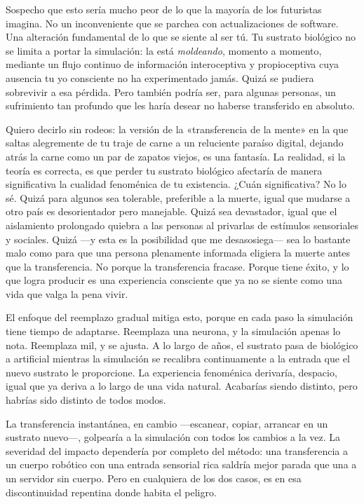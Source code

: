 \documentclass[11pt, twoside, openright]{book}
\begin{document}
Sospecho que esto sería mucho peor de lo que la mayoría de los futuristas imagina. No un inconveniente que se parchea con actualizaciones de software. Una alteración fundamental de lo que se siente al ser tú. Tu sustrato biológico no se limita a portar la simulación: la está \textit{moldeando}, momento a momento, mediante un flujo continuo de información interoceptiva y propioceptiva cuya ausencia tu yo consciente no ha experimentado jamás. Quizá se pudiera sobrevivir a esa pérdida. Pero también podría ser, para algunas personas, un sufrimiento tan profundo que les haría desear no haberse transferido en absoluto.

Quiero decirlo sin rodeos: la versión de la «transferencia de la mente» en la que saltas alegremente de tu traje de carne a un reluciente paraíso digital, dejando atrás la carne como un par de zapatos viejos, es una fantasía. La realidad, si la teoría es correcta, es que perder tu sustrato biológico afectaría de manera significativa la cualidad fenoménica de tu existencia. ¿Cuán significativa? No lo sé. Quizá para algunos sea tolerable, preferible a la muerte, igual que mudarse a otro país es desorientador pero manejable. Quizá sea devastador, igual que el aislamiento prolongado quiebra a las personas al privarlas de estímulos sensoriales y sociales. Quizá ---y esta es la posibilidad que me desasosiega--- sea lo bastante malo como para que una persona plenamente informada eligiera la muerte antes que la transferencia. No porque la transferencia fracase. Porque tiene éxito, y lo que logra producir es una experiencia consciente que ya no se siente como una vida que valga la pena vivir.

El enfoque del reemplazo gradual mitiga esto, porque en cada paso la simulación tiene tiempo de adaptarse. Reemplaza una neurona, y la simulación apenas lo nota. Reemplaza mil, y se ajusta. A lo largo de años, el sustrato pasa de biológico a artificial mientras la simulación se recalibra continuamente a la entrada que el nuevo sustrato le proporcione. La experiencia fenoménica derivaría, despacio, igual que ya deriva a lo largo de una vida natural. Acabarías siendo distinto, pero habrías sido distinto de todos modos.

La transferencia instantánea, en cambio ---escanear, copiar, arrancar en un sustrato nuevo---, golpearía a la simulación con todos los cambios a la vez. La severidad del impacto dependería por completo del método: una transferencia a un cuerpo robótico con una entrada sensorial rica saldría mejor parada que una a un servidor sin cuerpo. Pero en cualquiera de los dos casos, es en esa discontinuidad repentina donde habita el peligro.
\end{document}
